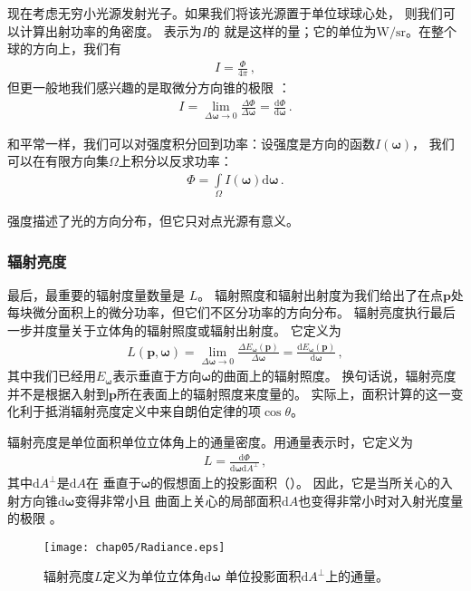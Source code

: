 现在考虑无穷小光源发射光子。如果我们将该光源置于单位球球心处，
则我们可以计算出射功率的角密度。
表示为$I$的
就是这样的量；它的单位为$\text{W}/\text{sr}$。在整个球的方向上，我们有
\begin{align*}
    I=\frac{\varPhi}{4\pi}\, ,
\end{align*}
但更一般地我们感兴趣的是取微分方向锥的极限
：
\begin{align*}
    I=\lim\limits_{\Delta{\bm\omega}\rightarrow 0}{\frac{\Delta\varPhi}{\Delta{\bm\omega}}}=\frac{\mathrm{d}\varPhi}{\mathrm{d}{\bm\omega}}\, .
\end{align*}

和平常一样，我们可以对强度积分回到功率：设强度是方向的函数$I({\bm\omega})$，
我们可以在有限方向集$\Omega$上积分以反求功率：
\begin{align*}
    \varPhi=\int\limits_{\Omega}I({\bm\omega})\mathrm{d}{\bm\omega}\, .
\end{align*}

强度描述了光的方向分布，但它只对点光源有意义。

\subsubsection*{辐射亮度}
最后，最重要的辐射度量数量是
$L$。
辐射照度和辐射出射度为我们给出了在点$\bm p$处
每块微分面积上的微分功率，但它们不区分功率的方向分布。
辐射亮度执行最后一步并度量关于立体角的辐射照度或辐射出射度。
它定义为
\begin{align*}
    L({\bm p},{\bm\omega})=\lim\limits_{\Delta{\bm\omega}\rightarrow 0}{\frac{\Delta E_{\bm\omega}({\bm p})}{\Delta{\bm\omega}}}=\frac{\mathrm{d}E_{\bm\omega}({\bm p})}{\mathrm{d}{\bm\omega}}\, ,
\end{align*}
其中我们已经用$ E_{\bm\omega}$表示垂直于方向$\bm\omega$的曲面上的辐射照度。
换句话说，辐射亮度并不是根据入射到$\bm p$所在表面上的辐射照度来度量的。
实际上，面积计算的这一变化利于抵消辐射亮度定义中来自朗伯定律的项$\cos\theta$。

辐射亮度是单位面积单位立体角上的通量密度。用通量表示时，它定义为
\begin{align}\label{eq:5.2}
    L=\frac{\mathrm{d}\varPhi}{\mathrm{d}{\bm\omega}\mathrm{d}A^{\perp}}\, ,
\end{align}
其中$\mathrm{d}A^{\perp}$是$\mathrm{d}A$在
垂直于$\bm\omega$的假想面上的投影面积（）。
因此，它是当所关心的入射方向锥$\mathrm{d}{\bm\omega}$变得非常小且
曲面上关心的局部面积$\mathrm{d}A$也变得非常小时对入射光度量的极限
。
\begin{figure}[htbp]
    \centering\texttt{[image: chap05/Radiance.eps]}
    \caption{辐射亮度$L$定义为单位立体角$\mathrm{d}{\bm\omega}$
    单位投影面积$\mathrm{d}A^{\perp}$上的通量。}
    \label{fig:5.10}
\end{figure}

